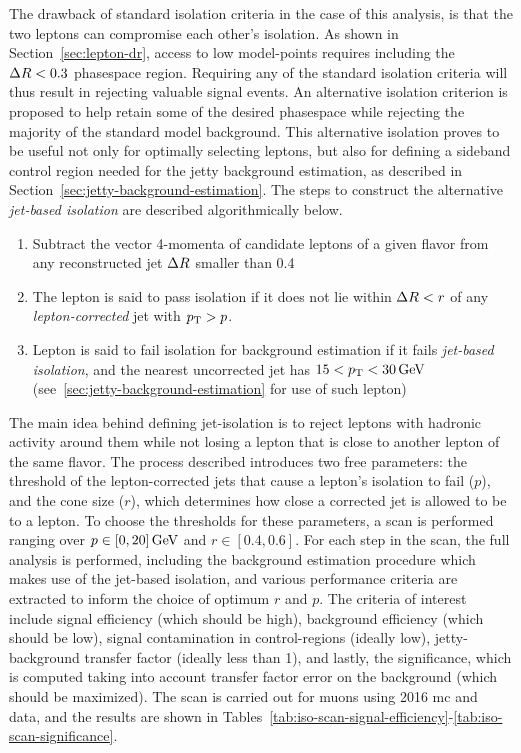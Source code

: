 The drawback of standard isolation criteria in the case of this analysis, is that the two leptons can compromise each other's isolation. As shown in Section~\ref{sec:lepton-dr}, access to low \dm model-points requires including the $\Delta R<0.3$ phasespace region. Requiring any of the standard isolation criteria will thus result in rejecting valuable signal events. An alternative isolation criterion is proposed to help retain some of the desired phasespace while rejecting the majority of the standard model background. This alternative isolation proves to be useful not only for optimally selecting leptons, but also for defining a sideband control region needed for the jetty background estimation, as described in Section~\ref{sec:jetty-background-estimation}. The steps to construct the alternative \emph{jet-based isolation} are described algorithmically below.
\begin{enumerate}
\item Subtract the vector 4-momenta of candidate leptons of a given flavor from any reconstructed jet $\Delta R$ smaller than 0.4
\item The lepton is said to pass isolation if it does not lie within $\Delta R<r$ of any \emph{lepton-corrected} jet with $p_{\mathrm{T}} > p$. 
\item Lepton is said to fail isolation for background estimation if it fails \emph{jet-based isolation}, and the nearest uncorrected jet has $15<p_{\mathrm{T}}<30\,\text{Ge\hspace{-.08em}V}$ (see~\ref{sec:jetty-background-estimation} for use of such lepton)
\end{enumerate}
The main idea behind defining jet-isolation is to reject leptons with hadronic activity around them while not losing a lepton that is close to another lepton of the same flavor. The process described introduces two free parameters: the \pt threshold of the lepton-corrected jets that cause a lepton's isolation to fail ($p$), and the cone size ($r$), which determines how close a corrected jet is allowed to be to a lepton. To choose the thresholds for these parameters, a scan is performed ranging over $p\in [0,20]\,\text{Ge\hspace{-.08em}V}$ and $r\in[0.4,0.6]$. For each step in the scan, the full analysis is performed, including the background estimation procedure which makes use of the jet-based isolation, and various performance criteria are extracted to inform the choice of optimum $r$ and $p$.  The criteria of interest include signal efficiency (which should be high), background efficiency (which should be low), signal contamination in control-regions (ideally low), jetty-background transfer factor (ideally less than 1), and lastly, the significance, which is computed taking into account transfer factor error on the background (which should be maximized). The scan is carried out for muons using 2016 \gls{mc} and data, and the results are shown in Tables~\ref{tab:iso-scan-signal-efficiency}-\ref{tab:iso-scan-significance}.

